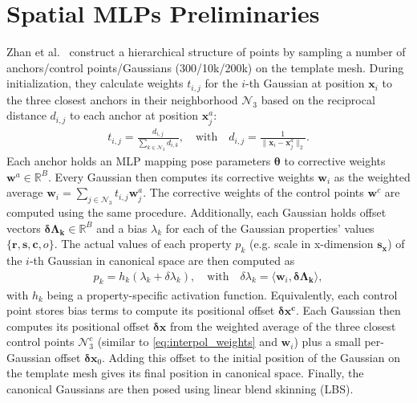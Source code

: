 \documentclass[runningheads]{llncs}
\newcommand{\vect}[1]{\boldsymbol{\mathbf{#1}}}
\begin{document}
\section{Spatial MLPs Preliminaries}

Zhan et al.~\cite{zhan2025spatialmlps} construct a hierarchical structure of points by sampling a number of anchors/control points/Gaussians (300/10k/200k) on the template mesh.
During initialization, they calculate weights $t_{i,j}$ for the $i$-th Gaussian at position $\vect{x}_i$ to the three closest anchors in their neighborhood $\mathcal{N}_3$ based on the reciprocal distance $d_{i,j}$ to each anchor at position $\vect{x}^a_j$:
\begin{align}
t_{i,j}=\frac{d_{i,j}}{\sum_{k\in \mathcal{N}_3} d_{i,k}}, \quad \text{with} \quad d_{i,j} = \frac{1}{\|\vect{x}_i - \vect{x}^a_j\|_2}.
\label{eq:interpol_weights}
\end{align}
%
Each anchor holds an MLP mapping pose parameters $\vect{\theta}$ to corrective weights $\vect{w}^a \in \mathbb{R}^B$. Every Gaussian then computes its corrective weights $\vect{w}_i$ as the weighted average $\vect{w}_i=\sum_{j\in \mathcal{N}_3} t_{i,j} \vect{w}_j^a$. The corrective weights of the control points $\vect{w}^c$ are computed using the same procedure.
Additionally, each Gaussian holds offset vectors $\vect{\delta\Lambda_k}\in\mathbb{R}^B$ and a bias $\lambda_k$ for each of the Gaussian properties' values $\{\vect{r},\vect{s},\vect{c},o\}$.
The actual values of each property $p_k$ (e.g. scale in x-dimension $\vect{s_x}$) of the $i$-th Gaussian in canonical space are then computed as
%
\begin{align}
p_k=h_k(\lambda_k + \delta\lambda_k), \quad \text{with} \quad \delta\lambda_k = \langle \vect{w}_i, \vect{\delta\Lambda_k} \rangle,
\end{align}
%
with $h_k$ being a property-specific activation function.
Equivalently, each control point stores bias terms to compute its positional offset $\vect{\delta x^c}$.
Each Gaussian then computes its positional offset $\vect{\delta x}$ from the weighted average of the three closest control points $\mathcal{N}^c_3$ (similar to \cref{eq:interpol_weights} and $\vect{w}_i$) plus a small per-Gaussian offset $\vect{\delta x}_0$.
Adding this offset to the initial position of the Gaussian on the template mesh gives its final position in canonical space.
Finally, the canonical Gaussians are then posed using linear blend skinning (LBS).
\end{document}
